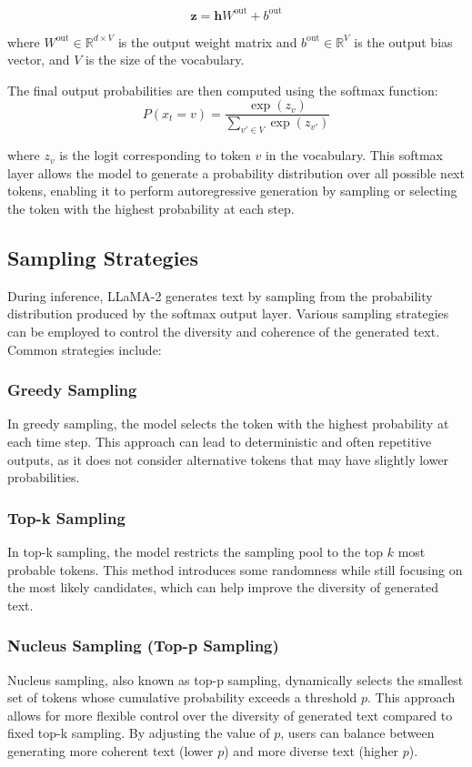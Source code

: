 \begin{equation}
    \label{eq:output_logits}
\mathbf{z} = \mathbf{h} W^{\text{out}} + b^{\text{out}}
\end{equation}

where $W^{\text{out}} \in \mathbb{R}^{d \times V}$ is the output weight matrix and $b^{\text{out}} \in \mathbb{R}^{V}$ is the output bias vector, and $V$ is the size of the vocabulary.

The final output probabilities are then computed using the softmax function:
\begin{equation}
P(x_t = v) = \frac{\exp(z_v)}{\sum_{v' \in V} \exp(z_{v'})}
\end{equation}

where $z_v$ is the logit corresponding to token $v$ in the vocabulary. This softmax layer allows the model to generate a probability distribution over all possible next tokens, enabling it to perform autoregressive generation by sampling or selecting the token with the highest probability at each step.


\subsection{Sampling Strategies}
During inference, LLaMA-2 generates text by sampling from the probability distribution produced by the softmax output layer. Various sampling strategies can be employed to control the diversity and coherence of the generated text. Common strategies include:

\subsubsection{Greedy Sampling}
In greedy sampling, the model selects the token with the highest probability at each time step. This approach can lead to deterministic and often repetitive outputs, as it does not consider alternative tokens that may have slightly lower probabilities.

\subsubsection{Top-k Sampling}
In top-k sampling, the model restricts the sampling pool to the top $k$ most probable tokens. This method introduces some randomness while still focusing on the most likely candidates, which can help improve the diversity of generated text.
\subsubsection{Nucleus Sampling (Top-p Sampling)}
Nucleus sampling, also known as top-p sampling, dynamically selects the smallest set of tokens whose cumulative probability exceeds a threshold $p$. This approach allows for more flexible control over the diversity of generated text compared to fixed top-k sampling. By adjusting the value of $p$, users can balance between generating more coherent text (lower $p$) and more diverse text (higher $p$).

